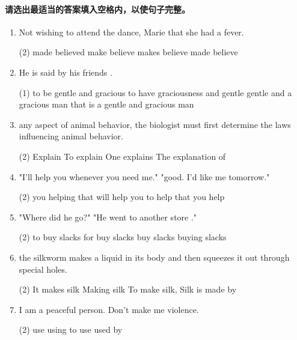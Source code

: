 \paragraph{请选出最适当的答案填入空格内，以使句子完整。}

\begin{enumerate}
\item Not wishing to attend the dance, Marie \ttu that she had a fever.
  \begin{tasks}(2)
    \task made believed
    \task make believe
    \task makes believe
    \task made believe
  \end{tasks}

\item He is said by his friends \ttu.
  \begin{tasks}(1)
    \task to be gentle and gracious
    \task to have graciousness and gentle
    \task gentle and a gracious man
    \task that is a gentle and gracious man
  \end{tasks}

\item \ttu any aspect of animal behavior, the biologist must first determine the laws influencing animal behavior.
  \begin{tasks}(2)
    \task Explain
    \task To explain
    \task One explains
    \task The explanation of
  \end{tasks}

\item "I'll help you whenever you need me." "good. I'd like \ttu me tomorrow."
  \begin{tasks}(2)
    \task you helping
    \task that will help
    \task you to help
    \task that you help
  \end{tasks}

\item "Where did he go?" "He went to another store \ttu ."
  \begin{tasks}(2)
    \task to buy slacks
    \task for buy slacks
    \task buy slacks
    \task buying slacks
  \end{tasks}

\item \ttu the silkworm makes a liquid in its body and then squeezes it out through special holes.
  \begin{tasks}(2)
    \task It makes silk
    \task Making silk
    \task To make silk,
    \task Silk is made by
  \end{tasks}

\item I am a peaceful person. Don't make me \ttu violence.
  \begin{tasks}(2)
    \task use
    \task using
    \task to use
    \task used by
  \end{tasks}


\end{enumerate}
